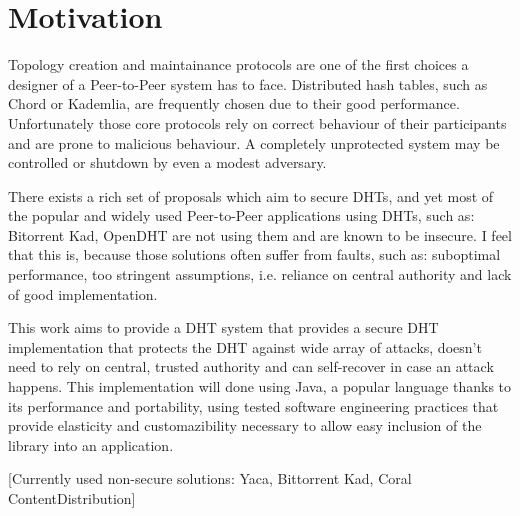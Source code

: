 \chapter{Motivation}
Topology creation and maintainance protocols are one of the first choices a
designer of a Peer-to-Peer system has to face. Distributed hash tables, such as
Chord or Kademlia, are frequently chosen due to their good performance.
Unfortunately those core protocols rely on correct behaviour of their
participants and are prone to malicious behaviour. A completely unprotected
system may be controlled or shutdown by even a modest adversary.

There exists a rich set of proposals which aim to secure DHTs, and yet most of
the popular and widely used Peer-to-Peer applications using DHTs, such as:
Bitorrent Kad, OpenDHT are not using them and are known to be insecure. I feel
that this is, because those solutions often suffer from faults, such as:
suboptimal performance, too stringent assumptions, i.e. reliance on central
authority and lack of good implementation.

This work aims to provide a DHT system that provides a secure DHT implementation
that protects the DHT against wide array of attacks, doesn't need to rely on
central, trusted authority and can self-recover in case an attack happens. This
implementation will done using Java, a popular language thanks to its
performance and portability, using tested software engineering practices that
provide elasticity and customazibility necessary to allow easy inclusion of the
library into an application.

[Currently used non-secure solutions: Yaca, Bittorrent Kad, Coral
ContentDistribution]
